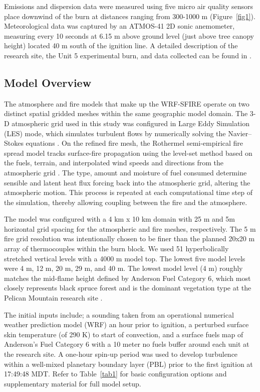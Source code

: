 \documentclass[preprints,article,accept,moreauthors,pdftex]{Definitions/mdpi}
\begin{document}
Emissions and dispersion data were measured using five micro air quality sensors place downwind of the burn at distances ranging from 300-1000 m (Figure~\ref{fig1}). Meteorological data was captured by an ATMOS-41 2D sonic anemometer, measuring every 10 seconds at 6.15 m above ground level (just above tree canopy height) located 40 m south of the ignition line. A detailed description of the research site, the Unit 5 experimental burn, and data collected can be found in \cite{thompson_recent_2020,thompson_data_2020,huda_study_2020}.

\subsection{Model Overview}

The atmosphere and fire models that make up the WRF-SFIRE operate on two distinct spatial gridded meshes within the same geographic model domain. The 3-D atmospheric grid used in this study was configured in Large Eddy Simulation (LES) mode, which simulates turbulent flows by numerically solving the Navier–Stokes equations \cite{mandel_coupled_2011,mandel_recent_2014}. On the refined fire mesh, the Rothermel semi-empirical fire spread model tracks surface-fire propagation using the level-set method based on the fuels, terrain, and interpolated wind speeds and directions from the atmospheric grid \cite{mandel_coupled_2011,mandel_recent_2014,munozesparza_accurate_2018}. The type, amount and moisture of fuel consumed determine sensible and latent heat flux forcing back into the atmospheric grid, altering the atmospheric motion. This process is repeated at each computational time step of the simulation, thereby allowing coupling between the fire and the atmosphere.

The model was configured with a 4 km x 10 km domain with 25 m and 5m horizontal grid spacing for the atmospheric and fire meshes, respectively. The 5 m fire grid resolution was intentionally chosen to be finer than the planned 20x20 m array of thermocouples within the burn block. We used 51 hyperbolically stretched vertical levels with a 4000 m model top. The lowest five model levels were 4 m, 12 m, 20 m, 29 m, and 40 m. The lowest model level (4 m) roughly matches the mid-flame height defined by Anderson Fuel Category 6, which most closely represents black spruce forest and is the dominant vegetation type at the Pelican Mountain research site \cite{anderson_aids_1982}.

The initial inputs include; a sounding taken from an operational numerical weather prediction model (WRF) an hour prior to ignition, a perturbed surface skin temperature (of 290 K) to start of convection, and a surface fuels map of Anderson’s Fuel Category 6 with a 10 meter no fuels buffer around each unit at the research site. A one-hour spin-up period was used to develop turbulence within a well-mixed planetary boundary layer (PBL) prior to the first ignition at 17:49:48 MDT. Refer to Table~\ref{tab1} for basic configuration options and supplementary material for full model setup.
\end{document}
